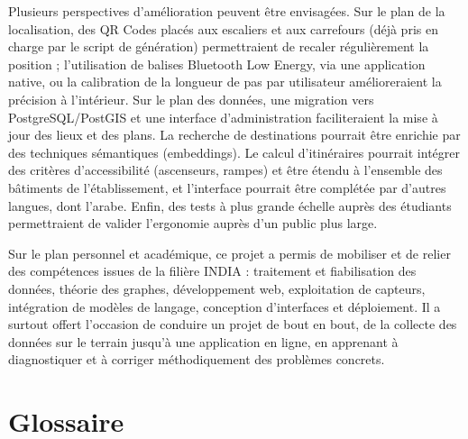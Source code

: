 \documentclass[12pt,a4paper]{report}
\begin{document}
Plusieurs perspectives d'amélioration peuvent être envisagées. Sur le plan de la localisation, des
QR Codes placés aux escaliers et aux carrefours (déjà pris en charge par le script de génération)
permettraient de recaler régulièrement la position ; l'utilisation de balises Bluetooth Low Energy,
via une application native, ou la calibration de la longueur de pas par utilisateur amélioreraient
la précision à l'intérieur. Sur le plan des données, une migration vers PostgreSQL/PostGIS et une
interface d'administration faciliteraient la mise à jour des lieux et des plans. La recherche de
destinations pourrait être enrichie par des techniques sémantiques (embeddings). Le calcul
d'itinéraires pourrait intégrer des critères d'accessibilité (ascenseurs, rampes) et être étendu à
l'ensemble des bâtiments de l'établissement, et l'interface pourrait être complétée par d'autres
langues, dont l'arabe. Enfin, des tests à plus grande échelle auprès des étudiants permettraient de
valider l'ergonomie auprès d'un public plus large.

Sur le plan personnel et académique, ce projet a permis de mobiliser et de relier des compétences
issues de la filière INDIA : traitement et fiabilisation des données, théorie des graphes,
développement web, exploitation de capteurs, intégration de modèles de langage, conception
d'interfaces et déploiement. Il a surtout offert l'occasion de conduire un projet de bout en bout,
de la collecte des données sur le terrain jusqu'à une application en ligne, en apprenant à
diagnostiquer et à corriger méthodiquement des problèmes concrets.

\chapter*{Glossaire}
\end{document}
